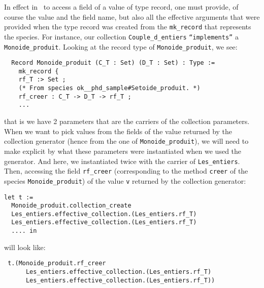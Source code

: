 In effect in \coq\, to access a field of a value of type record, one
must provide, of course the value and the field name, but also all the
effective arguments that were provided when the type record was
created from the {\tt mk\_record} that represents the species.
For instance, our collection {\tt Couple\_d\_entiers}
{\tt ``implements''} a {\tt Monoide\_produit}. Looking at the record
type of {\tt Monoide\_produit}, we see:
{\footnotesize
\begin{lstlisting}
  Record Monoide_produit (C_T : Set) (D_T : Set) : Type :=
    mk_record {
    rf_T :> Set ;
    (* From species ok__phd_sample#Setoide_produit. *)
    rf_creer : C_T -> D_T -> rf_T ;
    ...
\end{lstlisting}
}
that is we have 2 parameters that are the carriers of the collection
parameters. When we want to pick values from the fields of the value
returned by the collection generator (hence from the one of
{\tt Monoide\_produit}), we will need to make explicit by what these
parameters were instantiated when we used the generator. And here, we
instantiated twice with the carrier of {\tt Les\_entiers}.
Then, accessing the field {\tt rf\_creer} (corresponding to the method
{\tt creer} of the species {\tt Monoide\_produit}) of the value
{\tt v} returned by the collection generator:
{\footnotesize
\begin{lstlisting}
let t :=
  Monoide_produit.collection_create
  Les_entiers.effective_collection.(Les_entiers.rf_T)
  Les_entiers.effective_collection.(Les_entiers.rf_T)
  .... in
\end{lstlisting}
}
will look like:
{\footnotesize
\begin{lstlisting}
 t.(Monoide_produit.rf_creer
      Les_entiers.effective_collection.(Les_entiers.rf_T)
      Les_entiers.effective_collection.(Les_entiers.rf_T))
\end{lstlisting}
}

